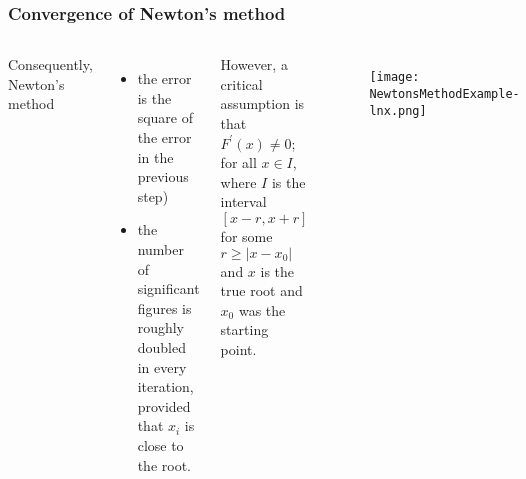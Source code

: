 \documentclass[hyperref={colorlinks=true}]{beamer}
\begin{document}
\begin{frame}%
  \frametitle{Convergence of Newton's method}

  \begin{columns}
  
   
      Consequently, Newton's method 
      \begin{itemize}
        \item the error is the square of the error in the previous step)
        \item the number of significant figures is roughly doubled in every iteration, provided that $x_i$ is  close to the root.
      \end{itemize} 
         
      However, a critical assumption is that $F^{\prime}(x) \neq 0$; for all $x \in I$, where $I$ is the interval $[x - r, x + r]$ for some $r \geq |x - x_0|$ and $x$ is the true root and $x_0$ was the starting point.
         
    
      \begin{figure}
        \texttt{[image: NewtonsMethodExample-lnx.png]}
      \end{figure}
    
  \end{columns}

\end{frame}


\end{document}
